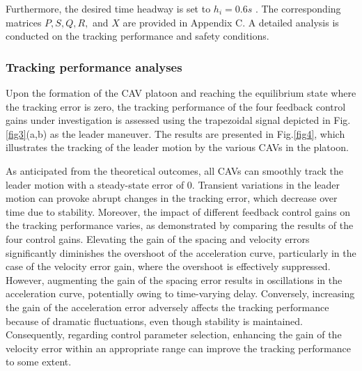 \documentclass[journal]{IEEEtran}
\begin{document}
Furthermore, the desired time headway is set to $ {h_i} = 0.6s $ \citep{li2017evaluation,ploeg2011connect}. The corresponding matrices $ P,S,Q,R, $ and $X$ are provided in Appendix C. A detailed analysis is conducted on the tracking performance and safety conditions.

\subsubsection{Tracking performance analyses}
\label{Section 5.2.1}


Upon the formation of the CAV platoon and reaching the equilibrium state where the tracking error is zero, the tracking performance of the four feedback control gains under investigation is assessed using the trapezoidal signal depicted in Fig.\ref{fig3}(a,b) as the leader maneuver. The results are presented in Fig.\ref{fig4}, which illustrates the tracking of the leader motion by the various CAVs in the platoon.

As anticipated from the theoretical outcomes, all CAVs can smoothly track the leader motion with a steady-state error of 0. Transient variations in the leader motion can provoke abrupt changes in the tracking error, which decrease over time due to stability. Moreover, the impact of different feedback control gains on the tracking performance varies, as demonstrated by comparing the results of the four control gains. Elevating the gain of the spacing and velocity errors significantly diminishes the overshoot of the acceleration curve, particularly in the case of the velocity error gain, where the overshoot is effectively suppressed. However, augmenting the gain of the spacing error results in oscillations in the acceleration curve, potentially owing to time-varying delay. Conversely, increasing the gain of the acceleration error adversely affects the tracking performance because of dramatic fluctuations, even though stability is maintained. Consequently, regarding control parameter selection, enhancing the gain of the velocity error within an appropriate range can improve the tracking performance to some extent.
\end{document}
